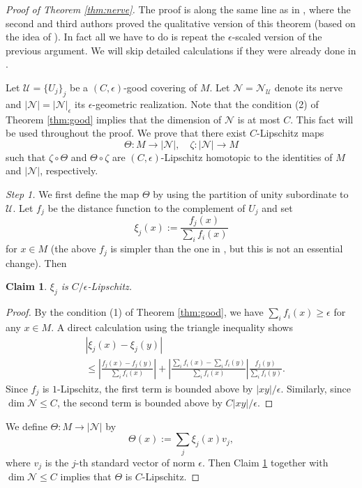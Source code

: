 \documentclass[a4paper,12pt]{amsart}
\theoremstyle{plain}
\newtheorem{clm}[thm]{Claim}
\theoremstyle{definition}
\numberwithin{thm}{section}
\numberwithin{equation}{section}
\newcommand{\step}[1]{\medskip\noindent\textit{#1.}}
\begin{document}
\begin{proof}[Proof of Theorem \ref{thm:nerve}]
The proof is along the same line as in \cite[\S3]{MY:lip}, where the second and third authors proved the qualitative version of this theorem (based on the idea of \cite[9.4.15]{Sha}).
In fact all we have to do is repeat the $\epsilon$-scaled version of the previous argument.
We will skip detailed calculations if they were already done in \cite{MY:lip}.

Let $\mathcal U=\{U_j\}_j$ be a $(C,\epsilon)$-good covering of $M$.
Let $\mathcal N=\mathcal N_{\mathcal U}$ denote its nerve and $|\mathcal N|=|\mathcal N|_\epsilon$ its $\epsilon$-geometric realization.
Note that the condition (2) of Theorem \ref{thm:good} implies that the dimension of $\mathcal N$ is at most $C$.
This fact will be used throughout the proof.
We prove that there exist $C$-Lipschitz maps
\[\Theta:M\to|\mathcal N|,\quad\zeta:|\mathcal N|\to M\]
such that $\zeta\circ\Theta$ and $\Theta\circ\zeta$ are $(C,\epsilon)$-Lipschitz homotopic to the identities of $M$ and $|\mathcal N|$, respectively.

\step{Step 1}
We first define the map $\Theta$ by using the partition of unity subordinate to $\mathcal U$.
Let $f_j$ be the distance function to the complement of $U_j$ and set
\[\xi_j(x):=\frac{f_j(x)}{\sum_if_i(x)}\]
for $x\in M$ (the above $f_j$ is simpler than the one in \cite{MY:lip}, but this is not an essential change).
Then

\begin{clm}\label{clm:xi}
$\xi_j$ is $C/\epsilon$-Lipschitz.
\end{clm}

\begin{proof}
By the condition (1) of Theorem \ref{thm:good}, we have $\sum_if_i(x)\ge\epsilon$ for any $x\in M$.
A direct calculation using the triangle inequality shows
\begin{align*}
&\left|\xi_j(x)-\xi_j(y)\right|\\
&\le\left|\frac{f_j(x)-f_j(y)}{\sum_if_i(x)}\right|+\left|\frac{\sum_if_i(x)-\sum_if_i(y)}{\sum_if_i(x)}\right|\frac{f_j(y)}{\sum_if_i(y)}.
\end{align*}
Since $f_j$ is $1$-Lipschitz, the first term is bounded above by $|xy|/\epsilon$.
Similarly, since $\dim\mathcal N\le C$, the second term is bounded above by $C|xy|/\epsilon$.
\end{proof}

We define $\Theta:M\to |\mathcal N|$ by
\[\Theta(x):=\sum_j\xi_j(x)v_j,\]
where $v_j$ is the $j$-th standard vector of norm $\epsilon$.
Then Claim \ref{clm:xi} together with $\dim\mathcal N\le C$ implies that $\Theta$ is $C$-Lipschitz.


\end{proof}
\end{document}
